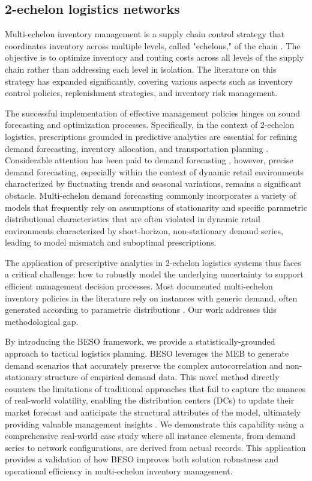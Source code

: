 \documentclass[mnsc,sglanonrev]{informs4}  %
\theoremstyle{remark}\newtheorem{remark}{Remark}
\begin{document}
\subsection{2-echelon logistics networks}

Multi-echelon inventory management is a supply chain control strategy that coordinates inventory across multiple levels, called "echelons," of the chain \citep{Clark60}. The objective is to optimize inventory and routing costs across all levels of the supply chain rather than addressing each level in isolation. The literature on this strategy has expanded significantly, covering various aspects such as inventory control policies, replenishment strategies, and inventory risk management.

The successful implementation of effective management policies hinges on sound forecasting and optimization processes. Specifically, in the context of 2-echelon logistics, prescriptions grounded in predictive analytics are essential for refining demand forecasting, inventory allocation, and transportation planning \citep{A01}. Considerable attention has been paid to demand forecasting \citep{Ma15,Shenstone01}, however, precise demand forecasting, especially within the context of dynamic retail environments characterized by fluctuating trends and seasonal variations, remains a significant obstacle. Multi-echelon demand forecasting commonly incorporates a variety of models that frequently rely on assumptions of stationarity and specific parametric distributional characteristics that are often violated in dynamic retail environments characterized by short-horizon, non-stationary demand series, leading to model mismatch and suboptimal prescriptions.

The application of prescriptive analytics in 2-echelon logistics systems thus faces a critical challenge: how to robustly model the underlying uncertainty to support efficient management decision processes. Most documented multi-echelon inventory policies in the literature rely on instances with generic demand, often generated according to parametric distributions \citep{Escorcia20}. Our work addresses this methodological gap.

By introducing the BESO framework, we provide a statistically-grounded approach to tactical logistics planning. BESO leverages the MEB to generate demand scenarios that accurately preserve the complex autocorrelation and non-stationary structure of empirical demand data. This novel method directly counters the limitations of traditional approaches that fail to capture the nuances of real-world volatility, enabling the distribution centers (DCs) to update their market forecast and anticipate the structural attributes of the model, ultimately providing valuable management insights \citep{P16}. We demonstrate this capability using a comprehensive real-world case study where all instance elements, from demand series to network configurations, are derived from actual records. This application provides a validation of how BESO improves both solution robustness and operational efficiency in multi-echelon inventory management.
\end{document}
